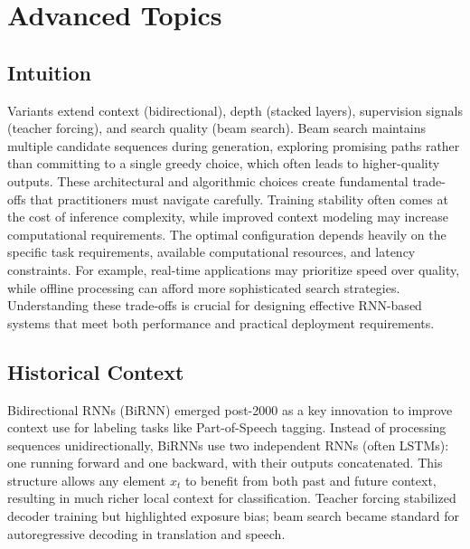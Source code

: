 
\section{Advanced Topics }
\label{sec:rnn-advanced}

\subsection*{Intuition}

Variants extend context (bidirectional), depth (stacked layers), supervision signals (teacher forcing), and search quality (beam search). Beam search maintains multiple candidate sequences during generation, exploring promising paths rather than committing to a single greedy choice, which often leads to higher-quality outputs. These architectural and algorithmic choices create fundamental trade-offs that practitioners must navigate carefully. Training stability often comes at the cost of inference complexity, while improved context modeling may increase computational requirements. The optimal configuration depends heavily on the specific task requirements, available computational resources, and latency constraints. For example, real-time applications may prioritize speed over quality, while offline processing can afford more sophisticated search strategies. Understanding these trade-offs is crucial for designing effective RNN-based systems that meet both performance and practical deployment requirements.

\subsection*{Historical Context}

Bidirectional RNNs (BiRNN) emerged post-2000 as a key innovation to improve context use for labeling tasks like Part-of-Speech tagging. Instead of processing sequences unidirectionally, BiRNNs use two independent RNNs (often LSTMs): one running forward and one backward, with their outputs concatenated. This structure allows any element $x_t$ to benefit from both past and future context, resulting in much richer local context for classification. Teacher forcing stabilized decoder training but highlighted exposure bias; beam search became standard for autoregressive decoding in translation and speech.


